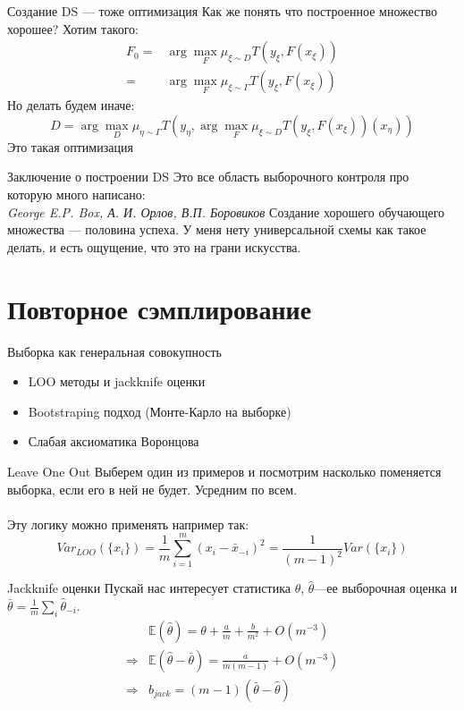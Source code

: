 \documentclass[14pt, fleqn, xcolor={dvipsnames, table}]{beamer}
\begin{document}
\begin{frame}{Создание DS --- тоже оптимизация}
\small
Как же понять что построенное множество хорошее? Хотим такого:
$$\begin{array}{rl}
F_0 =& \arg \max_{F} \mu_{\xi \sim D} T(y_{\xi}, F(x_{\xi})) \\
    =& \arg \max_{F} \mu_{\xi \sim \Gamma} T(y_{\xi}, F(x_{\xi}))
\end{array}$$
Но делать будем иначе:
$$
D = \arg \max_{D} \mu_{\eta \sim \Gamma} T(y_{\eta}, \arg \max_{F} \mu_{\xi \sim D} T(y_{\xi}, F(x_{\xi}))(x_\eta))
$$
Это такая оптимизация
\end{frame}

\begin{frame}{Заключение о построении DS}
Это все область выборочного контроля про которую много написано:\\
\textit{George E.P. Box, А. И. Орлов, В.П. Боровиков}
Создание хорошего обучающего множества --- половина успеха. У меня нету универсальной схемы как такое делать, и есть ощущение, что это на грани искусства.
\end{frame}

\section{Повторное сэмплирование}

\begin{frame}{Выборка как генеральная совокупность}
\begin{itemize}
  \item LOO методы и jackknife оценки
  \item Bootstraping подход (Монте-Карло на выборке)
  \item Слабая аксиоматика Воронцова
\end{itemize}
\end{frame}

\begin{frame}{Leave One Out}
Выберем один из примеров и посмотрим насколько поменяется выборка, если его в ней не будет. Усредним по всем.\\
\\
\small
Эту логику можно применять например так:
\normalsize
$$
Var_{LOO}(\{x_i\}) = \frac{1}{m} \sum_{i=1}^m \left(x_i - \bar{x}_{-i}\right)^2 = \frac{1}{(m-1)^2} Var(\{x_i\})
$$

\end{frame}

\begin{frame}{Jackknife оценки}
Пускай нас интересует статистика $\theta$, $\hat{\theta}$---ее выборочная оценка и $\bar{\theta} = \frac{1}{m} \sum_i \hat{\theta}_{-i}$.
$$\begin{array}{rl}
&\mathbb{E}(\hat{\theta}) = \theta + \frac{a}{m} + \frac{b}{m^2} + O(m^{-3}) \\
\Rightarrow & \mathbb{E}(\hat{\theta} - \bar{\theta}) = \frac{a}{m(m-1)} + O(m^{-3}) \\
\Rightarrow & b_{jack} = (m-1)(\bar{\theta} - \hat{\theta})
\end{array}$$
\end{frame}
\end{document}
